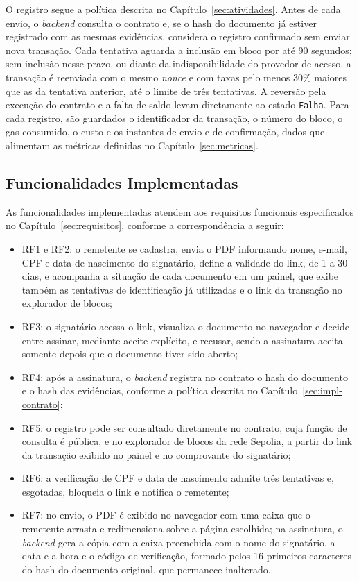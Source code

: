 \documentclass[
    12pt,
    a4paper,
    oneside,
    chapter=TITLE,
    section=TITLE,
    subsection=TITLE,
    subsubsection=TITLE,
    sumario=tradicional,
    english,
    brazil
]{abntex2}
\newcommand{\elem}[1]{\texttt{#1}}
\begin{document}
O registro segue a política descrita no Capítulo~\ref{sec:atividades}. Antes de cada envio, o \emph{backend} consulta o contrato e, se o hash do documento já estiver registrado com as mesmas evidências, considera o registro confirmado sem enviar nova transação. Cada tentativa aguarda a inclusão em bloco por até 90 segundos; sem inclusão nesse prazo, ou diante da indisponibilidade do provedor de acesso, a transação é reenviada com o mesmo \emph{nonce} e com taxas pelo menos 30\% maiores que as da tentativa anterior, até o limite de três tentativas. A reversão pela execução do contrato e a falta de saldo levam diretamente ao estado \elem{Falha}. Para cada registro, são guardados o identificador da transação, o número do bloco, o gas consumido, o custo e os instantes de envio e de confirmação, dados que alimentam as métricas definidas no Capítulo~\ref{sec:metricas}.

\subsection{Funcionalidades Implementadas}

As funcionalidades implementadas atendem aos requisitos funcionais especificados no Capítulo~\ref{sec:requisitos}, conforme a correspondência a seguir:
\begin{itemize}
    \item RF1 e RF2: o remetente se cadastra, envia o PDF informando nome, e-mail, CPF e data de nascimento do signatário, define a validade do link, de 1 a 30 dias, e acompanha a situação de cada documento em um painel, que exibe também as tentativas de identificação já utilizadas e o link da transação no explorador de blocos;
    \item RF3: o signatário acessa o link, visualiza o documento no navegador e decide entre assinar, mediante aceite explícito, e recusar, sendo a assinatura aceita somente depois que o documento tiver sido aberto;
    \item RF4: após a assinatura, o \emph{backend} registra no contrato o hash do documento e o hash das evidências, conforme a política descrita no Capítulo~\ref{sec:impl-contrato};
    \item RF5: o registro pode ser consultado diretamente no contrato, cuja função de consulta é pública, e no explorador de blocos da rede Sepolia, a partir do link da transação exibido no painel e no comprovante do signatário;
    \item RF6: a verificação de CPF e data de nascimento admite três tentativas e, esgotadas, bloqueia o link e notifica o remetente;
    \item RF7: no envio, o PDF é exibido no navegador com uma caixa que o remetente arrasta e redimensiona sobre a página escolhida; na assinatura, o \emph{backend} gera a cópia com a caixa preenchida com o nome do signatário, a data e a hora e o código de verificação, formado pelos 16 primeiros caracteres do hash do documento original, que permanece inalterado.
\end{itemize}
\end{document}
